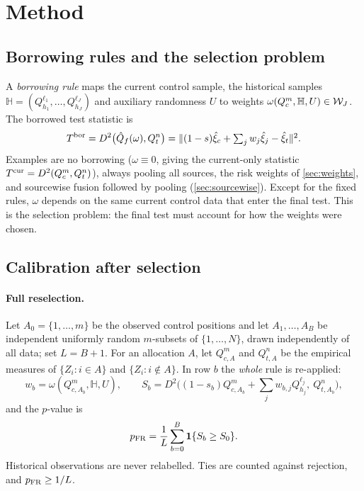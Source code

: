 \documentclass[11pt,a4paper]{article}
\begin{document}
\section{Method}\label{sec:method}

\subsection{Borrowing rules and the selection problem}\label{sec:rules}

A \emph{borrowing rule} maps the current control sample, the historical samples $\mathbb H=(Q_{h_1}^{\ell_1},\dots,Q_{h_J}^{\ell_J})$ and auxiliary randomness $U$ to weights $\omega(Q_c^m,\mathbb H,U)\in\mathcal{W}_J$. The borrowed test statistic is
\begin{equation}\label{eq:Tbor}
T^{\rm bor}=D^2\big(\hat Q_f(\omega),Q_t^n\big)=\lVert (1-s)\hat\xi_c+\textstyle\sum_jw_j\hat\xi_j-\hat\xi_t\rVert^2 .
\end{equation}
Examples are no borrowing ($\omega\equiv0$, giving the current-only statistic $T^{\rm cur}=D^2(Q_c^m,Q_t^n)$), always pooling all sources, the risk weights of \cref{sec:weights}, and sourcewise fusion followed by pooling (\cref{sec:sourcewise}). Except for the fixed rules, $\omega$ depends on the same current control data that enter the final test. This is the selection problem: the final test must account for how the weights were chosen.

\subsection{Calibration after selection}\label{sec:calib}

\paragraph{Full reselection.} Let $A_0=\{1,\dots,m\}$ be the observed control positions and let $A_1,\dots,A_B$ be independent uniformly random $m$-subsets of $\{1,\dots,N\}$, drawn independently of all data; set $L=B+1$. For an allocation $A$, let $Q^m_{c,A}$ and $Q^n_{t,A}$ be the empirical measures of $\{Z_i:i\in A\}$ and $\{Z_i:i\notin A\}$. In row $b$ the \emph{whole} rule is re-applied:
\begin{equation}\label{eq:rows}
w_b=\omega(Q_{c,A_b}^m,\mathbb H,U),\qquad S_b=D^2\big((1-s_b)Q_{c,A_b}^m+\textstyle\sum_jw_{b,j}Q_{h_j}^{\ell_j},\ Q_{t,A_b}^n\big),
\end{equation}
and the $p$-value is
\begin{equation}\label{eq:pFR}
p_{\rm FR}=\frac1L\sum_{b=0}^B\mathbf{1}\{S_b\ge S_0\}.
\end{equation}
Historical observations are never relabelled. Ties are counted against rejection, and $p_{\rm FR}\ge1/L$.
\end{document}
